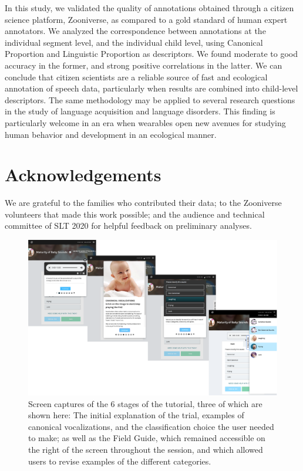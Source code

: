 \documentclass[english,,man]{apa6}
\begin{document}
In this study, we validated the quality of annotations obtained through a citizen science platform, Zooniverse, as compared to a gold standard of human expert annotators. We analyzed the correspondence between annotations at the individual segment level, and the individual child level, using Canonical Proportion and Linguistic Proportion as descriptors. We found moderate to good accuracy in the former, and strong positive correlations in the latter. We can conclude that citizen scientists are a reliable source of fast and ecological annotation of speech data, particularly when results are combined into child-level descriptors. The same methodology may be applied to several research questions in the study of language acquisition and language disorders. This finding is particularly welcome in an era when wearables open new avenues for studying human behavior and development in an ecological manner.

\newpage

\hypertarget{acknowledgements}{%
\section{Acknowledgements}\label{acknowledgements}}

We are grateful to the families who contributed their data; to the Zooniverse volunteers that made this work possible; and the audience and technical committee of SLT 2020 for helpful feedback on preliminary analyses.

\begin{figure}
\centering
\includegraphics{zooniverse-pufig.pdf}
\caption{\label{fig:fig-zoo}Screen captures of the 6 stages of the tutorial, three of which are shown here: The initial explanation of the trial, examples of canonical vocalizations, and the classification choice the user needed to make; as well as the Field Guide, which remained accessible on the right of the screen throughout the session, and which allowed users to revise examples of the different categories.}
\end{figure}
\end{document}
